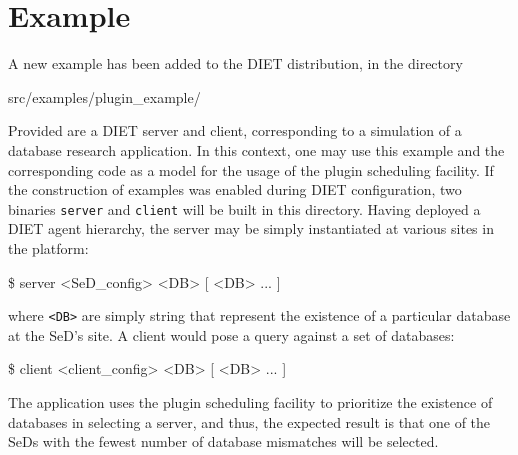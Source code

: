



\section{Example}

A new example has been added to the DIET distribution, in the
directory
\begin{code}
src/examples/plugin\_example/
\end{code}
Provided are a DIET server and client, corresponding to a simulation
of a database research application.  In this context, one may use this
example and the corresponding code as a model for the usage of the
plugin scheduling facility.  If the construction of examples was
enabled during DIET configuration, two binaries \texttt{server} and
\texttt{client} will be built in this directory.  Having deployed a
DIET agent hierarchy, the server may be simply instantiated at various
sites in the platform:
\begin{code}
  \$ server <SeD\_config> <DB> [ <DB> ... ]
\end{code}
where \texttt{<DB>} are simply string that represent the existence of
a particular database at the SeD's site.  A client would pose a query
against a set of databases:
\begin{code}
  \$ client <client\_config> <DB> [ <DB> ... ]
\end{code}
The application uses the plugin scheduling facility to prioritize the
existence of databases in selecting a server, and thus, the expected
result is that one of the SeDs with the fewest number of database
mismatches will be selected.

